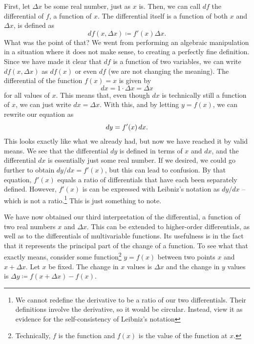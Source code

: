 \documentclass[a4paper,12pt]{article}
\begin{document}
First, let $\Delta x$ be some real number, just as $x$ is.
Then, we can call $df$ the differential of $f$, a function of $x$.
The differential itself is a function of both $x$ and $\Delta x$, is defined as
\begin{equation*}
    df(x, \Delta x) \coloneq f'(x) \Delta x.
\end{equation*}
What was the point of that?
We went from performing an algebraic manipulation in a situation where it does not make sense, to creating a perfectly fine definition.
Since we have made it clear that $df$ is a function of two variables, we can write $df(x, \Delta x)$ as $df(x)$ or even $df$ (we are not changing the meaning).
The differential of the function $f(x) = x$ is given by
\begin{equation*}
    dx = 1 \cdot \Delta x = \Delta x
\end{equation*}
for all values of $x$.
This means that, even though $dx$ is technically still a function of $x$, we can just write $dx = \Delta x$.
With this, and by letting $y = f(x)$, we can rewrite our equation as
\begin{equation*}
    dy = f'(x) \mathop{}\!d x.
\end{equation*}
This looks exactly like what we already had, but now we have reached it by valid means.
We see that the differential $dy$ is defined in terms of $x$ and $dx$, and the differential $dx$ is essentially just some real number.
If we desired, we could go further to obtain $dy/dx = f'(x)$, but this can lead to confusion.
By that equation, $f'(x)$ equals a ratio of differentials that have each been separately defined.
However, $f'(x)$ is can be expressed with Leibniz's notation as $dy/dx$ -- which is not a ratio.\footnote{We cannot redefine the derivative to be a ratio of our two differentials. Their definitions involve the derivative, so it would be circular. Instead, view it as evidence for the self-consistency of Leibniz's notation}
This is just something to note.

We have now obtained our third interpretation of the differential, a function of two real numbers $x$ and $\Delta x$.
This can be extended to higher-order differentials, as well as to the differentials of multivariable functions.
Its usefulness is in the fact that it represents the principal part of the change of a function.
To see what that exactly means, consider some function\footnote{Technically, $f$ is the function and $f(x)$ is the value of the function at $x$.} $y=f(x)$ between two points $x$ and $x + \Delta x$.
Let $x$ be fixed.
The change in $x$ values is $\Delta x$ and the change in $y$ values is $\Delta y \coloneq f(x + \Delta x) - f(x)$.
\end{document}
